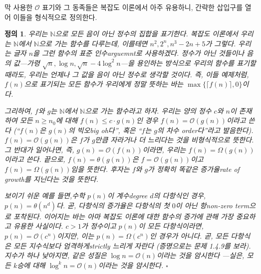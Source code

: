 \documentclass[a4paper,chapter,atbegshi,]{oblivoir}
\newtheorem{defn}{정의}[chapter]
\begin{document}
막 사용한 $\mathcal{O}$ 표기와 그 동족들은 복잡도 이론에서 아주 유용하니, 
간략한 삽입구를 열어 이들을 형식적으로 정의한다.

\begin{defn}\normalfont
  우리는 $\mathbb{N}$으로 모든 음이 아닌 정수의 집합을 표기한다. 복잡도
  이론에서 우리는 $\mathbb{N}$에서 $\mathbb{N}$으로 가는 함수를 다루는데,
  이를테면 $n^2,2^n,n^3-2n+5$가 그렇다. 우리는 글자 $n$을 그런 함수의 표준
  인수{\footnotesize arguemnt}로 사용하겠다. 정수가 아닌 것들이나 음의 
  값---가령 $\sqrt{n},\log n, \sqrt{n}-4\log^2n$---을 용인하는 방식으로 
  우리의 함수를 표기할 때라도, 우리는 언제나 그 값을 음이 아닌 정수로
  생각할 것이다. 즉, 이들 예제처럼, $f(n)$으로 표기되는 모든 함수가 
  우리에게 정말 뜻하는 바는 $\max\{\lceil f(n)\rceil,0\}$이다.

  그리하여, $f$와 $g$는 $\mathbb{N}$에서 $\mathbb{N}$으로 가는 함수라고 하자.
  우리는 양의 정수 $c$와 $n$이 존재하여 모든 $n\geq n_0$에 대해 $f(n)\leq c\cdot
  g(n)$인 경우 $f(n)=\mathcal{O}(g(n))$이라고 쓴다 (``$f(n)$은 $g(n)$의
  빅오{\footnotesize big oh}다'', 혹은 ``$f$는 $g$의 차수{\footnotesize 
  order}다''라고 발음한다). $f(n)=\mathcal{O}(g(n))$은 $f$가 $g$만큼
  자라거나 더 느리다는 것을 비형식적으로 뜻한다. 그 반대가 일어나면,
  즉, $g(n)=\mathcal{O}(f(n))$이라면, 우리는 $f(n)=\Omega(g(n))$이라고 쓴다.  
  끝으로, $f(n)=\theta(g(n))$은 $f=\mathcal{O}(g(n))$이고 $f(n)=\Omega(g(n))$임을
  뜻한다. 후자는 $f$와 $g$가 정확히 똑같은 \emph{증가율\footnotesize rate of
  growth}를 지닌다는 것을 뜻한다. 

  보이기 쉬운 예를 들면,수학 $p(n)$이 계수{\footnotesize degree} $d$의
  다항식인 경우, $p(n)=\theta(n^d)$다. 곧, 다항식의 증가율은 다항식의
  첫 $0$이 아닌 항{\footnotesize non-zero term}으로 포착된다. 이어지는 바는
  아마 복잡도 이론에 대한 함수의 증가에 관해 가장 중요하고 유용한 사실이다. 
  $c>1$가 정수이고 $p(n)$이 모든 다항식이라면, $p(n)=\mathcal{O}(c^n)$이지만, 
  이는 $p(n)=\Omega(c^n)$인 경우가 아니다. 곧, \emph{모든 다항식은 모든 지수식보다
  엄격하게{\footnotesize strictly} 느리게 자란다} (증명으로는 문제 1.4.9를 보라).
  지수가 하나 낮아지면, 같은 성질은 $\log n=\mathcal{O}(n)$이라는 것을 암시한다
  ---실은, 모든 $k$승에 대해 $\log^k n=\mathcal{O}(n)$이라는 것을 암시한다. 
  $\square$
\end{defn}
\end{document}
